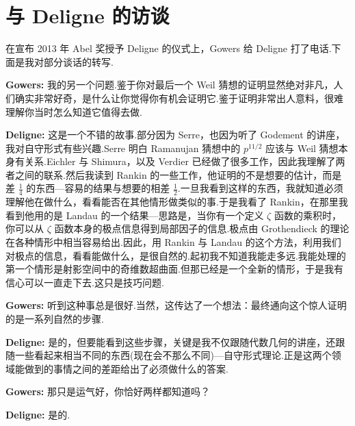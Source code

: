 \chapter*{与 Deligne 的访谈}

在宣布 2013 年 Abel 奖授予 Deligne 的仪式上，Gowers 给 Deligne 打了电话.下面是我对部分谈话的转写.

\textbf{Gowers:} 我的另一个问题.鉴于你对最后一个 Weil 猜想的证明显然绝对非凡，人们确实非常好奇，是什么让你觉得你有机会证明它.鉴于证明非常出人意料，很难理解你当时怎么知道它值得去做.

\textbf{Deligne:} 这是一个不错的故事.部分因为 Serre，也因为听了 Godement 的讲座，我对自守形式有些兴趣.Serre 明白 Ramanujan 猜想中的 $p^{11/2}$ 应该与 Weil 猜想本身有关系.Eichler 与 Shimura，以及 Verdier 已经做了很多工作，因此我理解了两者之间的联系.然后我读到 Rankin 的一些工作，他证明的不是想要的估计，而是差 $\frac{1}{4}$ 的东西---容易的结果与想要的相差 $\frac{1}{2}$.一旦我看到这样的东西，我就知道必须理解他在做什么，看看能否在其他情形做类似的事.于是我看了 Rankin，在那里我看到他用的是 Landau 的一个结果---思路是，当你有一个定义 $\zeta$ 函数的乘积时，你可以从 $\zeta$ 函数本身的极点信息得到局部因子的信息.极点由 Grothendieck 的理论在各种情形中相当容易给出.因此，用 Rankin 与 Landau 的这个方法，利用我们对极点的信息，看看能做什么，是很自然的.起初我不知道我能走多远.我能处理的第一个情形是射影空间中的奇维数超曲面.但那已经是一个全新的情形，于是我有信心可以一直走下去.这只是技巧问题.

\textbf{Gowers:} 听到这种事总是很好.当然，这传达了一个想法：最终通向这个惊人证明的是一系列自然的步骤.

\textbf{Deligne:} 是的，但要能看到这些步骤，关键是我不仅跟随代数几何的讲座，还跟随一些看起来相当不同的东西(现在会不那么不同)---自守形式理论.正是这两个领域能做到的事情之间的差距给出了必须做什么的答案.

\textbf{Gowers:} 那只是运气好，你恰好两样都知道吗？

\textbf{Deligne:} 是的.

